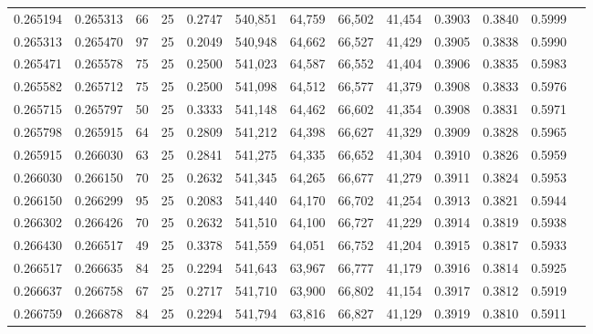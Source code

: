 \begin{tabular}{rrrrrrrrrrrrr}
0.265194 & 0.265313 &    66 &  25 &                                     0.2747 & 540,851 &  64,759 &  66,502 &  41,454 & 0.3903 & 0.3840 & 0.5999 \\
0.265313 & 0.265470 &    97 &  25 &                                     0.2049 & 540,948 &  64,662 &  66,527 &  41,429 & 0.3905 & 0.3838 & 0.5990 \\
0.265471 & 0.265578 &    75 &  25 &                                     0.2500 & 541,023 &  64,587 &  66,552 &  41,404 & 0.3906 & 0.3835 & 0.5983 \\
0.265582 & 0.265712 &    75 &  25 &                                     0.2500 & 541,098 &  64,512 &  66,577 &  41,379 & 0.3908 & 0.3833 & 0.5976 \\
0.265715 & 0.265797 &    50 &  25 &                                     0.3333 & 541,148 &  64,462 &  66,602 &  41,354 & 0.3908 & 0.3831 & 0.5971 \\
0.265798 & 0.265915 &    64 &  25 &                                     0.2809 & 541,212 &  64,398 &  66,627 &  41,329 & 0.3909 & 0.3828 & 0.5965 \\
0.265915 & 0.266030 &    63 &  25 &                                     0.2841 & 541,275 &  64,335 &  66,652 &  41,304 & 0.3910 & 0.3826 & 0.5959 \\
0.266030 & 0.266150 &    70 &  25 &                                     0.2632 & 541,345 &  64,265 &  66,677 &  41,279 & 0.3911 & 0.3824 & 0.5953 \\
0.266150 & 0.266299 &    95 &  25 &                                     0.2083 & 541,440 &  64,170 &  66,702 &  41,254 & 0.3913 & 0.3821 & 0.5944 \\
0.266302 & 0.266426 &    70 &  25 &                                     0.2632 & 541,510 &  64,100 &  66,727 &  41,229 & 0.3914 & 0.3819 & 0.5938 \\
0.266430 & 0.266517 &    49 &  25 &                                     0.3378 & 541,559 &  64,051 &  66,752 &  41,204 & 0.3915 & 0.3817 & 0.5933 \\
0.266517 & 0.266635 &    84 &  25 &                                     0.2294 & 541,643 &  63,967 &  66,777 &  41,179 & 0.3916 & 0.3814 & 0.5925 \\
0.266637 & 0.266758 &    67 &  25 &                                     0.2717 & 541,710 &  63,900 &  66,802 &  41,154 & 0.3917 & 0.3812 & 0.5919 \\
0.266759 & 0.266878 &    84 &  25 &                                     0.2294 & 541,794 &  63,816 &  66,827 &  41,129 & 0.3919 & 0.3810 & 0.5911 \\

\end{tabular}

